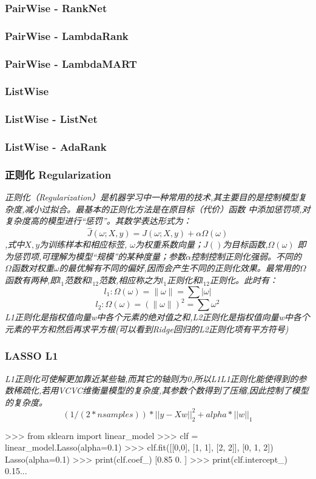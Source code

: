 \documentclass{scrartcl}
\numberwithin{equation}{section}   %
\begin{document}
\subsubsection{PairWise - RankNet}
\subsubsection{PairWise - LambdaRank}
\subsubsection{PairWise - LambdaMART}
\subsubsection{ListWise}
\subsubsection{ListWise - ListNet}
\subsubsection{ListWise - AdaRank}

\subsubsection{正则化 Regularization}

\textsl{
    正则化（Regularization）是机器学习中一种常用的技术,其主要目的是控制模型复杂度,减小过拟合。最基本的正则化方法是在原目标（代价）函数 中添加惩罚项,对复杂度高的模型进行“惩罚”。其数学表达形式为：
    $$\hat{J}(\omega; X, y) = J(\omega; X, y) + \alpha \Omega(\omega)$$,式中$X, y$为训练样本和相应标签, $\omega$为权重系数向量；$J()$为目标函数,$\Omega(\omega)$ 即为惩罚项,可理解为模型“规模”的某种度量；参数$\alpha$控制控制正则化强弱。不同的 $\Omega$函数对权重$\omega$的最优解有不同的偏好,因而会产生不同的正则化效果。最常用的$\Omega$函数有两种,即$l_1$范数和$l_12$范数,相应称之为$l_1$正则化和$l_12$正则化。此时有：$$l_1: \Omega(\omega) =\left\lVert \omega \right\rVert = \sum \left\lvert \omega \right\rvert  $$
    $$l_2: \Omega(\omega) =(\left\lVert \omega \right\rVert)^2 = \sum  \omega^2   $$L1正则化是指权值向量w中各个元素的绝对值之和,L2正则化是指权值向量w中各个元素的平方和然后再求平方根(可以看到Ridge回归的L2正则化项有平方符号)
}


\subsubsection{LASSO  L1}
\textsl{L1正则化可使解更加靠近某些轴,而其它的轴则为0,所以L1L1正则化能使得到的参数稀疏化,若用VCVC维衡量模型的复杂度,其参数个数得到了压缩,因此控制了模型的复杂度。}
$$(1 / (2 * nsamples)) * ||y - Xw||^2_2 + alpha * ||w||_1$$
\begin{python}
>>> from sklearn import linear_model
>>> clf = linear_model.Lasso(alpha=0.1)
>>> clf.fit([[0,0], [1, 1], [2, 2]], [0, 1, 2])
Lasso(alpha=0.1)
>>> print(clf.coef_)
[0.85 0.  ]
>>> print(clf.intercept_)
0.15...
\end{python}
\end{document}

